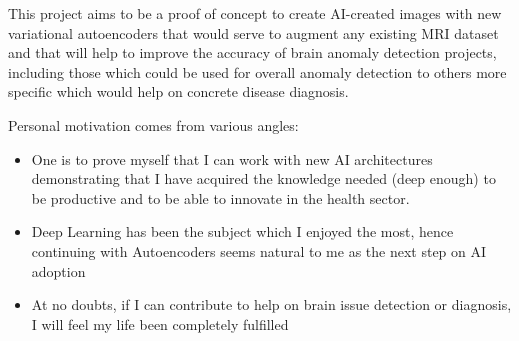 This project aims to be a proof of concept to create AI-created images with new variational autoencoders that would serve to augment any existing MRI dataset and that will help to improve the accuracy of brain anomaly detection projects, including those which could be used for overall anomaly detection to others more specific which would help on concrete disease diagnosis.

Personal motivation comes from various angles:

\begin{itemize}
    \item One is to prove myself that I can work with new AI architectures demonstrating that I have acquired the knowledge needed (deep enough) to be productive and to be able to innovate in the health sector.
    \item Deep Learning has been the subject which I enjoyed the most, hence continuing with Autoencoders seems natural to me as the next step on AI adoption
    \item At no doubts, if I can contribute to help on brain issue detection or diagnosis, I will feel my life been completely fulfilled
\end{itemize}